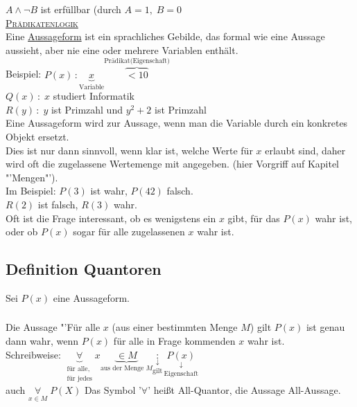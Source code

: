 \documentclass[10pt,a4paper,titlepage,fleqn]{article}
\begin{document}
\subsubsection{} $A\wedge \neg B$ ist erfüllbar (durch $A=1, \; B=0$\\
	\vspace{0.5em}\underline{\textsc{Prädikatenlogik}}\\
	Eine \underline{Aussageform} ist ein sprachliches Gebilde, das formal wie eine Aussage aussieht, 
	aber nie eine oder mehrere Variablen enthält.\\
	\textsf{Beispiel:} $P(x)\,: \underbrace{x}_{\text{Variable}}\overbrace{<10}^{\text{Prädikat(Eigenschaft)}}$\\
	$Q(x)\,:\;x$ studiert Informatik\\
	\vspace{0.5em}$R(y)\,:\;y$ ist Primzahl und $y^2+2$ ist Primzahl\\
	Eine Aussageform wird zur Aussage, wenn man die Variable durch ein konkretes Objekt ersetzt.\\
	Dies ist nur dann sinnvoll, wenn klar ist, welche Werte für $x$ erlaubt sind, daher wird oft
	die zugelassene Wertemenge mit angegeben. (hier Vorgriff auf Kapitel "'Mengen"').\\
	\textsf{Im Beispiel: } $P(3)$ ist wahr, $P(42)$ falsch.\\
	$R(2)$ ist falsch, $R(3)$ wahr.\\
	Oft ist die Frage interessant, ob es wenigstens ein $x$ gibt, für das $P(x)$ wahr ist, oder ob 
	$P(x)$ sogar für alle zugelassenen $x$ wahr ist.
\subsection{Definition Quantoren}
	Sei $P(x)$ eine Aussageform.
\subsubsection{}
	Die Aussage "'Für alle $x$ (aus einer bestimmten Menge $M$) gilt $P(x)$ ist genau dann wahr, 
	wenn $P(x)$ für alle in Frage \vspace{0.5em} kommenden $x$ wahr ist.\\
	\textsf{Schreibweise: }$\underbrace{\forall}_{\substack{\text{für alle,}\\\text{für jedes}}}
	x \underbrace{\in M}_{\text{aus der Menge }M}\underset{\text{gilt}}{\underset{\downarrow}{:}} 
	\underset{\text{Eigenschaft}}{\underset{\downarrow}{P(x)}}$\\
	auch $\underset{x\in M}{\forall} \; P(X)$ \quad Das Symbol '$\forall$' heißt All-Quantor, die 
	Aussage All-Aussage.
\end{document}
